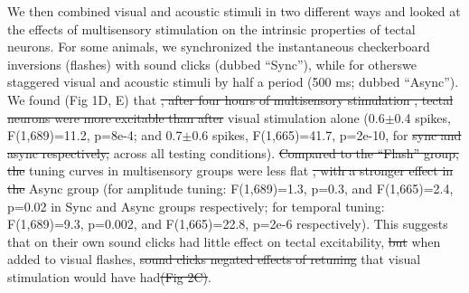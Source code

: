 \documentclass{article}
\providecommand{\DIFaddtex}[1]{{\protect\color{blue}{#1}}} %
\providecommand{\DIFdeltex}[1]{{\protect\color{red}\sout{#1}}}                      %
\providecommand{\DIFaddbegin}{} %
\providecommand{\DIFaddend}{} %
\providecommand{\DIFdelbegin}{} %
\providecommand{\DIFdelend}{} %
\providecommand{\DIFadd}[1]{\texorpdfstring{\DIFaddtex{#1}}{#1}} %
\providecommand{\DIFdel}[1]{\texorpdfstring{\DIFdeltex{#1}}{}} %
\newcommand{\DIFscaledelfig}{0.5}
\newlength{\DIFdelgraphicswidth} %
\newlength{\DIFdelgraphicsheight} %
\newcommand{\DIFaddincludegraphics}[2][]{{\color{blue}\fbox{\DIFOincludegraphics[#1]{#2}}}} %
\newcommand{\DIFdelincludegraphics}[2][]{%
\sbox{\DIFdelgraphicsbox}{\DIFOincludegraphics[#1]{#2}}%
\settoboxwidth{\DIFdelgraphicswidth}{\DIFdelgraphicsbox} %
\settoboxtotalheight{\DIFdelgraphicsheight}{\DIFdelgraphicsbox} %
\scalebox{\DIFscaledelfig}{%
\parbox[b]{\DIFdelgraphicswidth}{\usebox{\DIFdelgraphicsbox}\\[-\baselineskip] \rule{\DIFdelgraphicswidth}{0em}}\llap{\resizebox{\DIFdelgraphicswidth}{\DIFdelgraphicsheight}{%
\setlength{\unitlength}{\DIFdelgraphicswidth}%
\begin{picture}(1,1)%
\thicklines\linethickness{2pt} %
{\color[rgb]{1,0,0}\put(0,0){\framebox(1,1){}}}%
{\color[rgb]{1,0,0}\put(0,0){\line( 1,1){1}}}%
{\color[rgb]{1,0,0}\put(0,1){\line(1,-1){1}}}%
\end{picture}%
}\hspace*{3pt}}} %
} %
\DeclareRobustCommand{\DIFaddbegin}{\DIFOaddbegin \let\includegraphics\DIFaddincludegraphics} %
\DeclareRobustCommand{\DIFaddend}{\DIFOaddend \let\includegraphics\DIFOincludegraphics} %
\DeclareRobustCommand{\DIFdelbegin}{\DIFOdelbegin \let\includegraphics\DIFdelincludegraphics} %
\DeclareRobustCommand{\DIFdelend}{\DIFOaddend \let\includegraphics\DIFOincludegraphics} %
\begin{document}
We then combined visual and acoustic stimuli in two different ways and looked at the effects of multisensory stimulation on the intrinsic properties of tectal neurons. For some animals, we synchronized the instantaneous checkerboard inversions (flashes) with sound clicks (dubbed “Sync”), while for others\DIFaddbegin \DIFadd{, }\DIFaddend we staggered visual and acoustic stimuli by half a period (500 ms; dubbed “Async”). We found (Fig 1D, E) that \DIFdelbegin \DIFdel{, after four hours of multisensory stimulation , tectal neurons were more excitable than after }\DIFdelend \DIFaddbegin \DIFadd{multisensory stimulation did not suppress excitability of tectal neurons as strongly as }\DIFaddend visual stimulation alone (0.6$\pm$0.4 spikes, F(1,689)=11.2, p=8e-4; and 0.7$\pm$0.6 spikes, F(1,665)=41.7, p=2e-10, for \DIFdelbegin \DIFdel{sync and async respectively, }\DIFdelend \DIFaddbegin \DIFadd{Sync and Async respectively, compared to Flash, }\DIFaddend across all testing conditions). \DIFdelbegin \DIFdel{Compared to the “Flash” group, the }\DIFdelend \DIFaddbegin \DIFadd{Moreover, both temporal and amplitude }\DIFaddend tuning curves in multisensory groups were less flat \DIFdelbegin \DIFdel{, with a stronger effect in the }\DIFdelend \DIFaddbegin \DIFadd{than in the Flash group, which was especially noticeable for the }\DIFaddend Async group (for amplitude tuning: F(1,689)=1.3, p=0.3, and F(1,665)=2.4, p=0.02 in Sync and Async groups respectively; for temporal tuning: F(1,689)=9.3, p=0.002, and F(1,665)=22.8, p=2e-6 respectively). This suggests that \DIFaddbegin \DIFadd{while }\DIFaddend on their own sound clicks had little effect on tectal excitability, \DIFdelbegin \DIFdel{but }\DIFdelend when added to visual flashes, \DIFdelbegin \DIFdel{sound clicks negated effects of retuning }\DIFdelend \DIFaddbegin \DIFadd{they negated some of the retuning effects }\DIFaddend that visual stimulation would have had\DIFdelbegin \DIFdel{(Fig 2C)}\DIFdelend .
\end{document}
